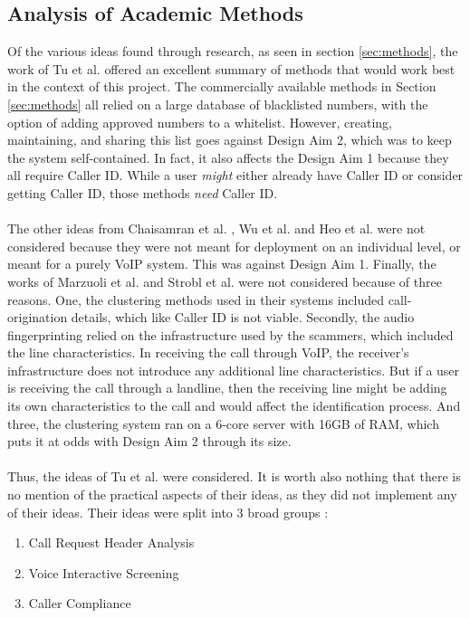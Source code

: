 \documentclass[main.tex]{subfiles}
\begin{document}
\subsection{Analysis of Academic Methods}
Of the various ideas found through research, as seen in section \ref{sec:methods}, the work of Tu et al. \cite{cisco} offered an excellent summary of methods that would work best in the context of this project. The commercially available methods in Section \ref{sec:methods} all relied on a large database of blacklisted numbers, with the option of adding approved numbers to a whitelist. However, creating, maintaining, and sharing this list goes against Design Aim 2, which was to keep the system self-contained. In fact, it also affects the Design Aim 1 because they all require Caller ID. While a user \textit{might} either already have Caller ID or consider getting Caller ID, those methods \textit{need} Caller ID.
\\\\
The other ideas from Chaisamran et al. \cite{chaisa}, Wu et al. \cite{wu} and Heo et al. \cite{heo} were not considered because they were not meant for deployment on an individual level, or meant for a purely VoIP system. This was against Design Aim 1. Finally, the works of Marzuoli et al. \cite{marzuoli} and Strobl et al. \cite{strobl} were not considered because of three reasons. One, the clustering methods used in their systems included call-origination details, which like Caller ID is not viable. Secondly, the audio fingerprinting relied on the infrastructure used by the scammers, which included the line characteristics. In receiving the call through VoIP, the receiver's infrastructure does not introduce any additional line characteristics. But if a user is receiving the call through a landline, then the receiving line might be adding its own characteristics to the call and would affect the identification process. And three, the clustering system ran on a 6-core server with 16GB of RAM, which puts it at odds with Design Aim 2 through its size.
\\\\
Thus, the ideas of Tu et al. \cite{cisco} were considered. It is worth also nothing that there is no mention of the practical aspects of their ideas, as they did not implement any of their ideas. Their ideas were split into 3 broad groups \cite{cisco}:

\begin{enumerate}
	\item Call Request Header Analysis
	\item Voice Interactive Screening
	\item Caller Compliance
\end{enumerate}
\end{document}
